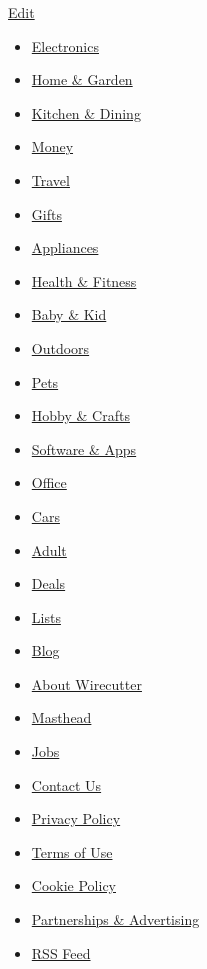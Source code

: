 \href{https://thewirecutter.com/wp-admin/post.php?post=78495\&action=edit}{Edit}

\begin{itemize}
\tightlist
\item
  \href{/wirecutter/electronics/}{Electronics}
\item
  \href{/wirecutter/home-garden/}{Home \& Garden}
\item
  \href{/wirecutter/kitchen-dining/}{Kitchen \& Dining}
\item
  \href{/wirecutter/money/}{Money}
\item
  \href{/wirecutter/travel/}{Travel}
\item
  \href{/wirecutter/gifts/}{Gifts}
\item
  \href{/wirecutter/appliances/}{Appliances}
\item
  \href{/wirecutter/health-fitness/}{Health \& Fitness}
\item
  \href{/wirecutter/baby-kid/}{Baby \& Kid}
\item
  \href{/wirecutter/outdoors/}{Outdoors}
\item
  \href{/wirecutter/pets/}{Pets}
\item
  \href{/wirecutter/hobby-crafts/}{Hobby \& Crafts}
\item
  \href{/wirecutter/software/}{Software \& Apps}
\item
  \href{/wirecutter/office/}{Office}
\item
  \href{/wirecutter/cars/}{Cars}
\item
  \href{/wirecutter/adult/}{Adult}
\item
  \href{/wirecutter/deals/}{Deals}
\item
  \href{/wirecutter/lists/}{Lists}
\item
  \href{/wirecutter/blog/}{Blog}
\end{itemize}

\begin{itemize}
\tightlist
\item
  \href{/wirecutter/about/}{About Wirecutter}
\item
  \href{/wirecutter/masthead/}{Masthead}
\item
  \href{/wirecutter/jobs/}{Jobs}
\item
  \href{/wirecutter/contact-us/}{Contact Us}
\end{itemize}

\begin{itemize}
\tightlist
\item
  \href{https://www.nytimes3xbfgragh.onion/subscription/privacy-policy\#/privacy}{Privacy
  Policy}
\item
  \href{https://help.nytimes3xbfgragh.onion/hc/en-us/articles/115014893428-Terms-of-service}{Terms
  of Use}
\item
  \href{https://www.nytimes3xbfgragh.onion/subscription/privacy-policy\#/cookie}{Cookie
  Policy}
\item
  \href{/wirecutter/partners/}{Partnerships \& Advertising}
\item
  \href{/wirecutter/feed/}{RSS Feed}
\end{itemize}

